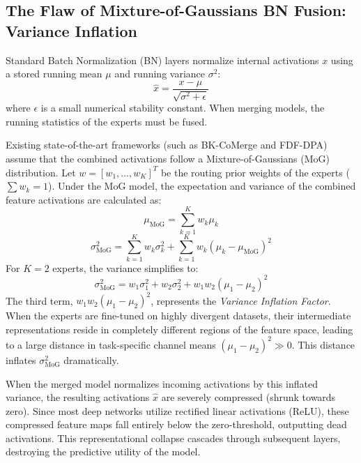 \documentclass{article}
\theoremstyle{plain}
\theoremstyle{definition}
\theoremstyle{remark}
\begin{document}
\subsection{The Flaw of Mixture-of-Gaussians BN Fusion: Variance Inflation}
Standard Batch Normalization (BN) layers normalize internal activations $x$ using a stored running mean $\mu$ and running variance $\sigma^2$:
\begin{equation}
  \hat{x} = \frac{x - \mu}{\sqrt{\sigma^2 + \epsilon}}
\end{equation}
where $\epsilon$ is a small numerical stability constant. When merging models, the running statistics of the experts must be fused.

Existing state-of-the-art frameworks (such as BK-CoMerge and FDF-DPA) assume that the combined activations follow a Mixture-of-Gaussians (MoG) distribution. Let $w = [w_1, \dots, w_K]^T$ be the routing prior weights of the experts ($\sum w_k = 1$). Under the MoG model, the expectation and variance of the combined feature activations are calculated as:
\begin{equation}
  \mu_{\text{MoG}} = \sum_{k=1}^K w_k \mu_k
\end{equation}
\begin{equation}
  \sigma^2_{\text{MoG}} = \sum_{k=1}^K w_k \sigma_k^2 + \sum_{k=1}^K w_k (\mu_k - \mu_{\text{MoG}})^2
\end{equation}
For $K=2$ experts, the variance simplifies to:
\begin{equation}
  \sigma^2_{\text{MoG}} = w_1 \sigma_1^2 + w_2 \sigma_2^2 + w_1 w_2 (\mu_1 - \mu_2)^2
\end{equation}
The third term, $w_1 w_2 (\mu_1 - \mu_2)^2$, represents the \emph{Variance Inflation Factor}. When the experts are fine-tuned on highly divergent datasets, their intermediate representations reside in completely different regions of the feature space, leading to a large distance in task-specific channel means $(\mu_1 - \mu_2)^2 \gg 0$. This distance inflates $\sigma^2_{\text{MoG}}$ dramatically.

When the merged model normalizes incoming activations by this inflated variance, the resulting activations $\hat{x}$ are severely compressed (shrunk towards zero). Since most deep networks utilize rectified linear activations (ReLU), these compressed feature maps fall entirely below the zero-threshold, outputting dead activations. This representational collapse cascades through subsequent layers, destroying the predictive utility of the model.
\end{document}
